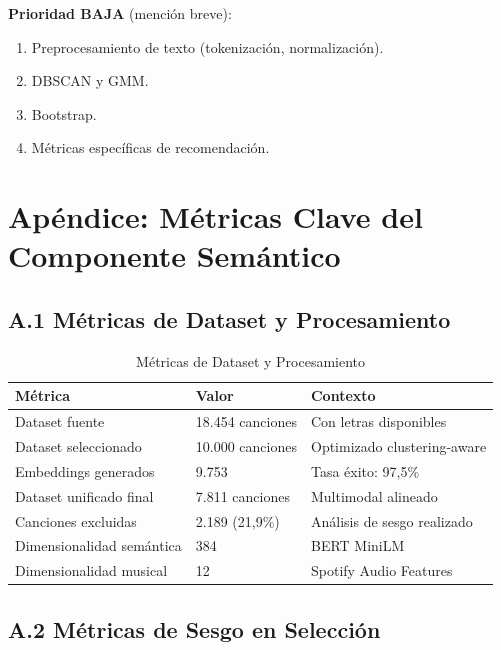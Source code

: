 \textbf{Prioridad BAJA} (mención breve):
\begin{enumerate}
    \item Preprocesamiento de texto (tokenización, normalización).
    \item DBSCAN y GMM.
    \item Bootstrap.
    \item Métricas específicas de recomendación.
\end{enumerate}


\section*{Apéndice: Métricas Clave del Componente Semántico}
\label{sec:apendice-metricas}

\subsection*{A.1 Métricas de Dataset y Procesamiento}

\begin{table}[htbp]
\centering
\caption{Métricas de Dataset y Procesamiento}
\label{tab:metricas-dataset}
\begin{tabular}{lll}
\toprule
\textbf{Métrica} & \textbf{Valor} & \textbf{Contexto} \\
\midrule
Dataset fuente & 18.454 canciones & Con letras disponibles \\
Dataset seleccionado & 10.000 canciones & Optimizado clustering-aware \\
Embeddings generados & 9.753 & Tasa éxito: 97,5\% \\
Dataset unificado final & 7.811 canciones & Multimodal alineado \\
Canciones excluidas & 2.189 (21,9\%) & Análisis de sesgo realizado \\
Dimensionalidad semántica & 384 & BERT MiniLM \\
Dimensionalidad musical & 12 & Spotify Audio Features \\
\bottomrule
\end{tabular}
\end{table}

\subsection*{A.2 Métricas de Sesgo en Selección}

